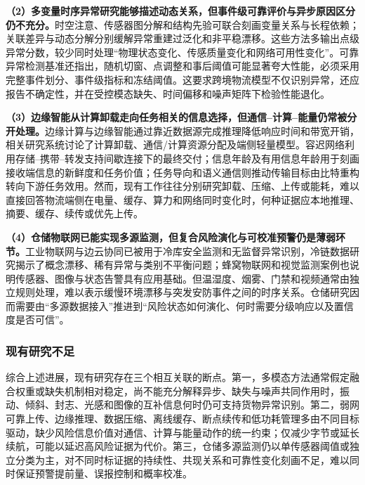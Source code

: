 \textbf{（2）多变量时序异常研究能够描述动态关系，但事件级可靠评价与异步原因区分仍不充分。}时空注意、传感器图分解和结构先验可联合刻画变量关系与长程依赖\cite{anomalydetectionfor2024,graphbasedtime2024,fusiongraphstructure2024}；关联差异与动态分解分别缓解异常重建过泛化和非平稳漂移\cite{anomalytransformertime2022,driftdoesnt2023}。这些方法多输出点级异常分数，较少同时处理“物理状态变化、传感质量变化和网络可用性变化”。可靠异常检测基准还指出，随机切窗、点调整和事后阈值可能显著夸大性能，必须采用完整事件划分、事件级指标和冻结阈值\cite{theelephantin2024,deeplearningfor2024}。这要求跨境物流模型不仅识别异常，还应报告不确定性，并在受控模态缺失、时间偏移和噪声矩阵下检验性能退化。

\textbf{（3）边缘智能从计算卸载走向任务相关的信息选择，但通信--计算--能量仍常被分开处理。}边缘计算与边缘智能通过靠近数据源完成推理降低响应时间和带宽开销，相关研究系统讨论了计算卸载、通信/计算资源分配及端侧轻量模型\cite{edgecomputingvision2016,edgeintelligencepaving2019,mobileedgecomputing2017,asurveyon2017,mcunettinydeep2020}。容迟网络利用存储--携带--转发支持间歇连接下的最终交付\cite{adelaytolerant2003}；信息年龄及有用信息年龄用于刻画接收端信息的新鲜度和任务价值\cite{ageofinformation2021,optimizetheage2024}；任务导向和语义通信则推动传输目标由比特重构转向下游任务效用\cite{taskorientedcommunication2022,semanticcommunicationenabling2023}。然而，现有工作往往分别研究卸载、压缩、上传或能耗，难以直接回答物流端侧在电量、缓存、算力和网络同时变化时，何种证据应本地推理、摘要、缓存、续传或优先上传。

\textbf{（4）仓储物联网已能实现多源监测，但复合风险演化与可校准预警仍是薄弱环节。}工业物联网与边云协同已被用于冷库安全监测和无监督异常识别\cite{industrialinternetof2022}，冷链数据研究揭示了概念漂移、稀有异常与类别不平衡问题\cite{ananomalydetection2025}；蜂窝物联网和视觉监测案例也说明传感器、图像与状态告警具有应用基础\cite{deeplearninganomaly2021,intelligentmonitoringand2024}。但温湿度、烟雾、门禁和视频通常由独立规则处理，难以表示缓慢环境漂移与突发安防事件之间的时序关系。仓储研究因而需要由“多源数据接入”推进到“风险状态如何演化、何时需要分级响应以及置信度是否可信”。

\subsubsection{现有研究不足}

综合上述进展，现有研究存在三个相互关联的断点。第一，多模态方法通常假定融合权重或缺失机制相对稳定，尚不能充分解释异步、缺失与噪声共同作用时，振动、倾斜、封志、光感和图像的互补信息何时仍可支持货物异常识别。第二，弱网可靠上传、边缘推理、数据压缩、离线缓存、断点续传和低功耗管理多由不同目标驱动，缺少风险信息价值对通信、计算与能量动作的统一约束；仅减少字节或延长续航，可能以延迟高风险证据为代价。第三，仓储多源监测仍以单传感器阈值或独立分类为主，对不同时标证据的持续性、共现关系和可靠性变化刻画不足，难以同时保证预警提前量、误报控制和概率校准。

